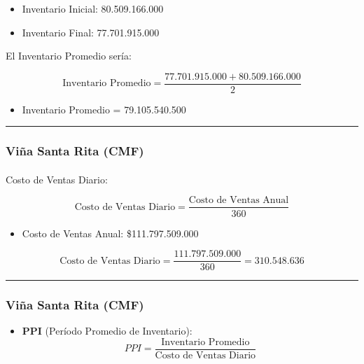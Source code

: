 \documentclass[
  letterpaper,
  DIV=11,
  numbers=noendperiod]{scrartcl}
\makeatletter
\let\oldparagraph\paragraph
\renewcommand{\paragraph}{
    \@ifstar
      \xxxParagraphStar
      \xxxParagraphNoStar
  }
\newcommand{\xxxParagraphStar}[1]{\oldparagraph*{#1}\mbox{}}
\newcommand{\xxxParagraphNoStar}[1]{\oldparagraph{#1}\mbox{}}
\providecommand{\tightlist}{%
  \setlength{\itemsep}{0pt}\setlength{\parskip}{0pt}}\usepackage{longtable,booktabs,array}
\makeatother
\begin{document}
\begin{itemize}
\tightlist
\item
  Inventario Inicial: 80.509.166.000
\item
  Inventario Final: 77.701.915.000
\end{itemize}

El Inventario Promedio sería:

\[
\text{Inventario Promedio} = \frac{77.701.915.000 + 80.509.166.000}{2}
\]

\begin{itemize}
\tightlist
\item
  Inventario Promedio = 79.105.540.500
\end{itemize}

\begin{center}\rule{0.5\linewidth}{0.5pt}\end{center}

\subsubsection{Viña Santa Rita (CMF)}\label{viuxf1a-santa-rita-cmf-1}

\paragraph{Costo de Ventas Diario:}\label{costo-de-ventas-diario}

\[
\text{Costo de Ventas Diario} = \frac{\text{Costo de Ventas Anual}}{360}
\]

\begin{itemize}
\tightlist
\item
  Costo de Ventas Anual: \$111.797.509.000
\end{itemize}

\[
\text{Costo de Ventas Diario}= \frac{111.797.509.000}{360} = 310.548.636
\]

\begin{center}\rule{0.5\linewidth}{0.5pt}\end{center}

\subsubsection{Viña Santa Rita (CMF)}\label{viuxf1a-santa-rita-cmf-2}

\begin{itemize}
\tightlist
\item
  \textbf{PPI} (Período Promedio de Inventario): \[ 
  PPI = \frac{\text{Inventario Promedio}}{\text{Costo de Ventas Diario}} 
  \]
\end{itemize}
\end{document}
